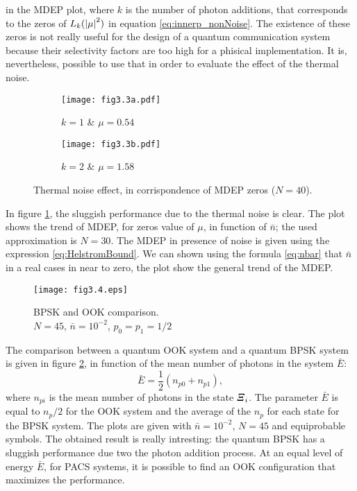     in the MDEP plot, where $k$ is the number of photon additions, that corresponds to the zeros
    of $L_k(\absolutevalue{\mu}^2)$ in equation \ref{eq:innerp_nonNoise}.
    The existence of these zeros is not really useful for the design of a quantum communication
    system because their selectivity factors are too high for a phisical implementation. It is, 
    nevertheless, possible to use that in order to evaluate the effect of the thermal noise.
    \begin{figure}[t]
        \begin{subfigure}{0.5\textwidth}
            \texttt{[image: fig3.3a.pdf]}
            \caption{$k=1$ \& $\mu = 0.54$}
        \end{subfigure}
        \begin{subfigure}{0.5\textwidth}
            \texttt{[image: fig3.3b.pdf]}
            \caption{$k=2$ \& $\mu = 1.58$}
        \end{subfigure}
        \caption{Thermal noise effect, in corrispondence of MDEP zeros ($N=40$).}
        \label{fig:3.3}
    \end{figure}
    In figure \ref{fig:3.3}, the sluggish performance due to the thermal noise is clear. The plot
    shows the trend of MDEP, for zeros value of $\mu$, in function of $\bar{n}$; the used approximation
    is $N=30$. The MDEP in presence of noise is given using the expression \ref{eq:HelstromBound}.
    We can shown using the formula \ref{eq:nbar} that $\bar{n}$ in a real cases in near to zero, the 
    plot show the general trend of the MDEP.

    \begin{figure}[t]
        \texttt{[image: fig3.4.eps]}
        \caption{BPSK and OOK comparison. \\$N=45$, $\bar{n}=10^{-2}$, $p_0=p_1=1/2$}
        \label{fig:3.4}
    \end{figure}
    The comparison between a quantum OOK system and a quantum BPSK system is given in figure 
    \ref{fig:3.4}, in function of the mean number of photons in the system $\bar{E}$:
    \begin{equation*}
        \bar{E}=\frac{1}{2} \left(n_{p0}+n_{p1}\right),
    \end{equation*}
    where $n_{pi}$ is the mean number of photons in the state $\Operator{\varXi}_i$.
    The parameter $\bar{E}$ is equal to $n_p/2$ for the OOK system and the average of the $n_p$ for 
    each state for the BPSK system.
    The plots are given with $\bar{n}= 10^{-2}$, $N=45$ and equiprobable symbols.
    The obtained result is really intresting: the quantum BPSK has a sluggish performance due two 
    the photon addition process. At an equal level of energy $\bar{E}$, for PACS systems, it is
    possible to find an OOK configuration that maximizes the performance.
    